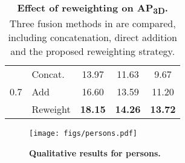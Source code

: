 \begin{table}
{\begin{spacing}{1.1}
{\begin{tabular}{|p{0.5cm}<{\centering}|p{1.6cm}<{\centering} |ccc|}
                 \multirow{3}{*}{0.7}              &  Concat.                                          & 13.97                         &11.63                           &9.67                \\          
                 
                                                                &  Add                                       & 16.60                     & 13.59                         & 11.20             \\
                                                                &  Reweight                                             & \textbf{18.15}            & \textbf{14.26}                & \textbf{13.72}         \\ \hline 
				\end{tabular}  
				
			} 
			\end{spacing}
     }
	\caption{\textbf{Effect of reweighting on AP\textsubscript{3D}.} Three fusion methods in \fig{\ref{fig:fusion}} are compared, including concatenation, direct addition and the proposed reweighting strategy.}
	\label{tab:3dapnorew} 
\end{table}


\begin{figure}
    \centering
    \texttt{[image: figs/persons.pdf]}
    \caption{\textbf{Qualitative results for persons.}}
    \label{fig:vis_persons}
\end{figure}




